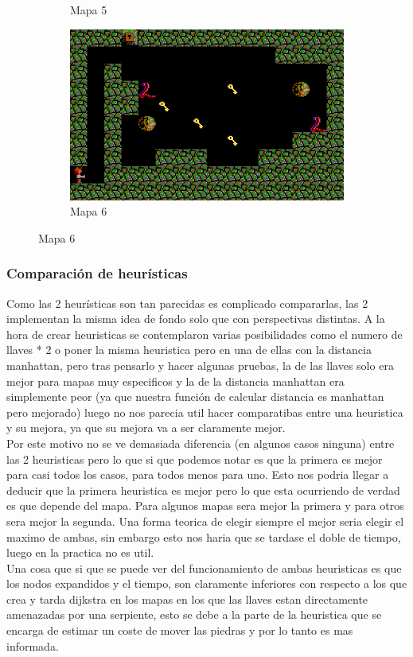 \documentclass[11pt,spanish]{article}
\begin{document}
\begin{figure}[H]
\begin{subfigure}[b]{0.24\linewidth}
					\caption{Mapa 5}
				\end{subfigure}
				\begin{subfigure}[b]{0.39\linewidth}
					\includegraphics[width=\linewidth]{astar/lab6.png}
					\caption{Mapa 6}
				\end{subfigure}
			\end{figure}
			
		\subsubsection{Comparación de heurísticas}
			Como las 2 heurísticas son tan parecidas es complicado compararlas, las 2 implementan la misma idea de fondo solo que con perspectivas distintas. A la hora de crear heuristicas se contemplaron varias posibilidades como el numero de llaves * 2 o poner la misma heuristica pero en una de ellas con la distancia manhattan, pero tras pensarlo y hacer algunas pruebas, la de las llaves solo era mejor para mapas muy especificos y la de la distancia manhattan era simplemente peor (ya que nuestra función de calcular distancia es manhattan pero mejorado) luego no nos parecia util hacer comparatibas entre una heuristica y su mejora, ya que su mejora va a ser claramente mejor.\\
			Por este motivo no se ve demasiada diferencia (en algunos casos ninguna) entre las 2 heuristicas pero lo que si que podemos notar es que la primera es mejor para casi todos los casos, para todos menos para uno. Esto nos podria llegar a deducir que la primera heuristica es mejor pero lo que esta ocurriendo de verdad es que depende del mapa. Para algunos mapas sera mejor la primera y para otros sera mejor la segunda. Una forma teorica de elegir siempre el mejor seria elegir el maximo de ambas, sin embargo esto nos haria que se tardase el doble de tiempo, luego en la practica no es util.\\
			Una cosa que si que se puede ver del funcionamiento de ambas heuristicas es que los nodos expandidos y el tiempo, son claramente inferiores con respecto a los que crea y tarda dijkstra en los mapas en los que las llaves estan directamente amenazadas por una serpiente, esto se debe a la parte de la heuristica que se encarga de estimar un coste de mover las piedras y por lo tanto es mas informada.
\end{document}
